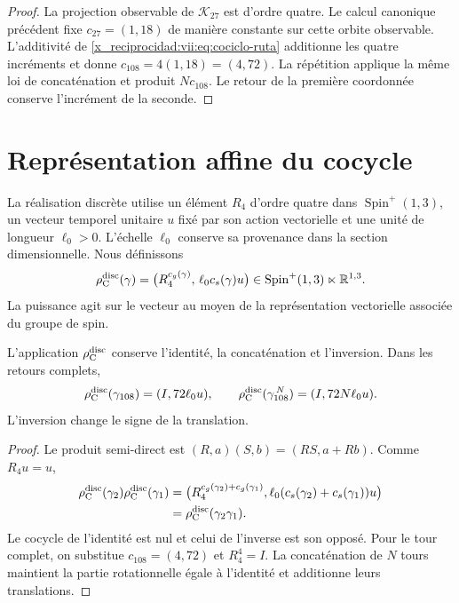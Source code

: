 \begin{proof}
La projection observable de \(\mathcal K_{27}\) est d'ordre quatre. Le calcul canonique précédent fixe \(c_{27}=(1,18)\) de manière constante sur cette orbite observable. L'additivité de \eqref{x_reciprocidad:vii:eq:cociclo-ruta} additionne les quatre incréments et donne \(c_{108}=4(1,18)=(4,72)\). La répétition applique la même loi de concaténation et produit \(Nc_{108}\). Le retour de la première coordonnée conserve l'incrément de la seconde.
\end{proof}

\section{Représentation affine du cocycle}
\label{x_reciprocidad:vii:subsec:representacion-afin-cociclo}

La réalisation discrète utilise un élément \(R_4\) d'ordre quatre dans
\(\operatorname{Spin}^+(1,3)\), un vecteur temporel unitaire \(u\)
fixé par son action vectorielle et une unité de longueur \(\ell_0>0\).
L'échelle \(\ell_0\) conserve sa provenance dans la section dimensionnelle.
Nous définissons
\begin{equation}
 \rho_{\rm C}^{\rm disc}(\gamma)=
 \bigl(R_4^{c_g(\gamma)},\,\ell_0c_s(\gamma)u\bigr)
 \in\operatorname{Spin}^+(1,3)\ltimes\mathbb R^{1,3}.
 \label{x_reciprocidad:vii:eq:representacion-discreta-memoria}
\end{equation}
La puissance agit sur le vecteur au moyen de la représentation vectorielle
associée du groupe de spin.

\begin{theorem}
\label{x_reciprocidad:vii:thm:traslacion-memoria}
L'application \(\rho_{\rm C}^{\rm disc}\) conserve l'identité,
la concaténation et l'inversion. Dans les retours complets,
\begin{equation}
 \rho_{\rm C}^{\rm disc}(\gamma_{108})=(I,72\ell_0u),\qquad
 \rho_{\rm C}^{\rm disc}(\gamma_{108}^{\,N})=(I,72N\ell_0u).
 \label{x_reciprocidad:vii:eq:traslacion-retorno-108}
\end{equation}
L'inversion change le signe de la translation.
\end{theorem}

\begin{proof}
Le produit semi-direct est
\((R,a)(S,b)=(RS,a+Rb)\). Comme \(R_4u=u\),
\[
\begin{split}
 \rho_{\rm C}^{\rm disc}(\gamma_2)
 \rho_{\rm C}^{\rm disc}(\gamma_1)
 &=
 \bigl(R_4^{c_g(\gamma_2)+c_g(\gamma_1)},
 \ell_0(c_s(\gamma_2)+c_s(\gamma_1))u\bigr)\\
 &=\rho_{\rm C}^{\rm disc}(\gamma_2\gamma_1).
\end{split}
\]
Le cocycle de l'identité est nul et celui de l'inverse est son opposé.
Pour le tour complet, on substitue \(c_{108}=(4,72)\) et
\(R_4^4=I\). La concaténation de \(N\) tours maintient la partie
rotationnelle égale à l'identité et additionne leurs translations.
\end{proof}

